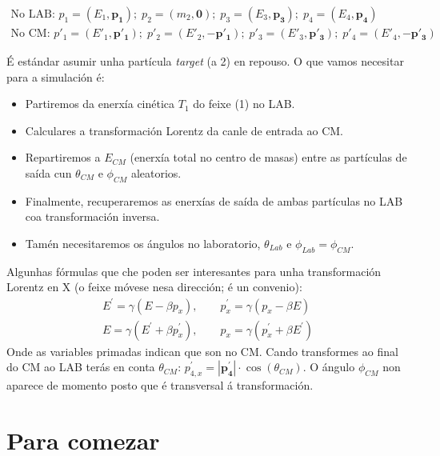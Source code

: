 \documentclass[11pt, a4paper]{article}
\newcommand{\vect}[1]{\boldsymbol{#1}}
\begin{document}
\begin{equation*}
    \begin{gathered}
        \text{No LAB:  }p_1=\left(E_1, \vect{p_1}\right); \; p_2=\left(m_2, \vect{0}\right); \; p_3=\left(E_3, \vect{p_3}\right); \; p_4=\left(E_4, \vect{p_4}\right) \\
        \text{No CM:  }p'_1=\left(E'_1, \vect{p'_1}\right); \;  p'_2=\left(E'_2, -\vect{p'_1}\right); \; p'_3=\left(E'_3, \vect{p'_3}\right); \; p'_4=\left(E'_4, -\vect{p'_3}\right)
    \end{gathered}
\end{equation*}

É estándar asumir unha partícula \textit{target} (a 2) en repouso. O que vamos necesitar para a simulación é:
\begin{itemize}
    \item Partiremos da enerxía cinética $T_1$ do feixe (1) no LAB.
    \item Calculares a transformación Lorentz da canle de entrada ao CM.
    \item Repartiremos a $E_{CM}$ (enerxía total no centro de masas) entre as partículas de saída cun $\theta_{CM}$ e $\phi_{CM}$ aleatorios.
    \item Finalmente, recuperaremos as enerxías de saída de ambas partículas no LAB coa transformación inversa.
    \item Tamén necesitaremos os ángulos no laboratorio, $\theta_{Lab}$ e $\phi_{Lab} = \phi_{CM}$.
\end{itemize}

Algunhas fórmulas que che poden ser interesantes para unha transformación Lorentz en X (o feixe móvese nesa dirección; é un convenio):
\begin{gather*}
    E^{\prime} = \gamma \left(E - \beta p_x\right), \qquad p^{\prime}_{x} = \gamma \left(p_x - \beta E\right)\\
    E = \gamma \left(E^{\prime} + \beta p_{x}^{\prime}\right), \qquad p_x = \gamma \left(p^{\prime}_x + \beta E^{\prime}\right)
\end{gather*}
Onde as variables primadas indican que son no CM. Cando transformes ao final do CM ao LAB terás en conta $\theta_{CM}$: $p_{4,x}^{\prime} = |\vect{p^{\prime}_4}| \cdot\cos(\theta_{CM})$. O ángulo $\phi_{CM}$ non aparece de momento posto que é transversal á transformación.

\section{Para comezar}
\end{document}
